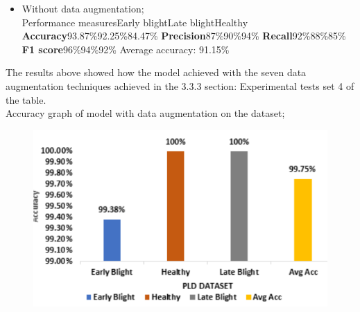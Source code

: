 \documentclass[11pt]{report}
\begin{document}
\begin{itemize}
	\item Without data augmentation;\\
	Performance measures\hspace{3cm}Early blight\hspace{2cm}Late blight\hspace{2cm}Healthy\\
	\textbf{Accuracy}\hspace{6cm}93.87\%\hspace{3cm}92.25\%\hspace{2cm}84.47\%
	\textbf{Precision}\hspace{6cm}87\%\hspace{3.5cm}90\%\hspace{3cm}94\%
	\textbf{Recall}\hspace{6.5cm}92\%\hspace{3.5cm}88\%\hspace{3cm}85\%
	\textbf{F1 score}\hspace{6cm}96\%\hspace{3.5cm}94\%\hspace{3cm}92\%
	Average accuracy: 91.15\%
	
\end{itemize}


The results above showed how the model achieved with the seven data augmentation techniques achieved in the 3.3.3 section: Experimental tests set 4 of the table.\\

Accuracy graph of model with data augmentation on the dataset;\\
\begin{figure}[h]
	\centerline{\small 
		\includegraphics[height=0.2\textheight]  {p1}}
\end{figure}
\end{document}
